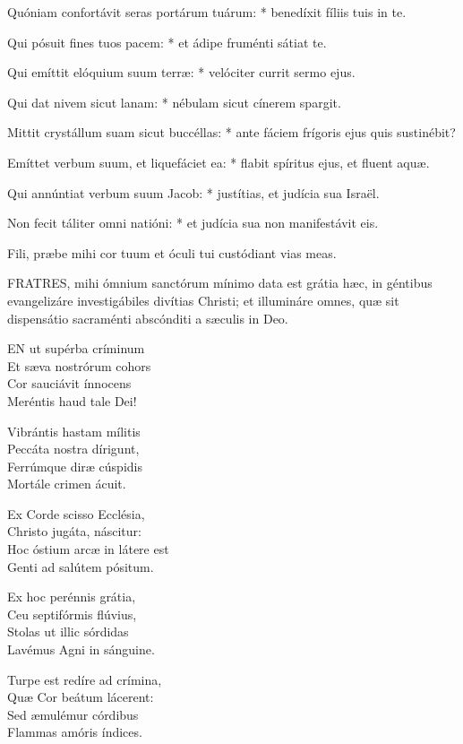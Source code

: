Quóniam confortávit seras portárum tuárum: * benedíxit fíliis tuis in te.

Qui pósuit fines tuos pacem: * et ádipe fruménti sátiat te.

Qui emíttit elóquium suum terræ: * velóciter currit sermo ejus.

Qui dat nivem sicut lanam: * nébulam sicut cínerem spargit.

Mittit crystállum suam sicut buccéllas: * ante fáciem frígoris ejus quis sustinébit?

Emíttet verbum suum, et liquefáciet ea: * flabit spíritus ejus, et fluent aquæ.

Qui annúntiat verbum suum Jacob: * justítias, et judícia sua Israël.

Non fecit táliter omni natióni: * et judícia sua non manifestávit eis.

 Fili, præbe mihi cor tuum et óculi tui custódiant vias meas.


\lettrine[lines=2]{F}{RATRES}, mihi ómnium sanctórum mínimo data est grátia hæc, in géntibus evangelizáre investigábiles divítias Christi; et illumináre omnes, quæ sit dispensátio sacraménti abscónditi a sæculis in Deo.


\lettrine[lines=2]{E}{N} ut supérba críminum\\
Et sæva nostrórum cohors\\
Cor sauciávit ínnocens\\
Meréntis haud tale Dei!

Vibrántis hastam mílitis\\
Peccáta nostra dírigunt,\\
Ferrúmque diræ cúspidis\\
Mortále crimen ácuit.

Ex Corde scisso Ecclésia,\\
Christo jugáta, náscitur:\\
Hoc óstium arcæ in látere est\\
Genti ad salútem pósitum.

Ex hoc perénnis grátia,\\
Ceu septifórmis flúvius,\\
Stolas ut illic sórdidas\\
Lavémus Agni in sánguine.

Turpe est redíre ad crímina,\\
Quæ Cor beátum lácerent:\\
Sed æmulémur córdibus\\
Flammas amóris índices.

